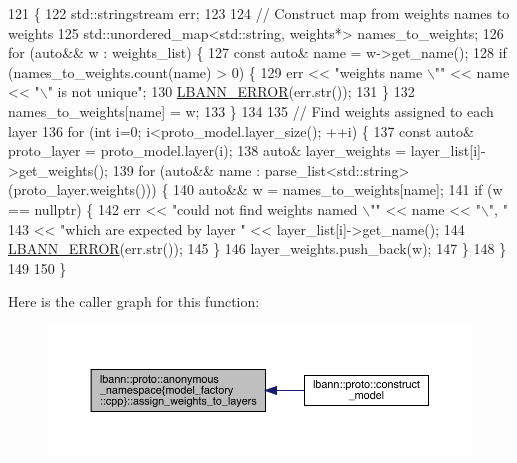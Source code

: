 \begin{DoxyCode}
121                                                                   \{
122   std::stringstream err;
123 
124   \textcolor{comment}{// Construct map from weights names to weights}
125   std::unordered\_map<std::string, weights*> names\_to\_weights;
126   \textcolor{keywordflow}{for} (\textcolor{keyword}{auto}&& w : weights\_list) \{
127     \textcolor{keyword}{const} \textcolor{keyword}{auto}& name = w->get\_name();
128     \textcolor{keywordflow}{if} (names\_to\_weights.count(name) > 0) \{
129       err << \textcolor{stringliteral}{"weights name \(\backslash\)""} << name << \textcolor{stringliteral}{"\(\backslash\)" is not unique"};
130       \hyperlink{base_8hpp_a80b1d707117e968a6951b7222e4b2b87}{LBANN\_ERROR}(err.str());
131     \}
132     names\_to\_weights[name] = w;
133   \}
134 
135   \textcolor{comment}{// Find weights assigned to each layer}
136   \textcolor{keywordflow}{for} (\textcolor{keywordtype}{int} i=0; i<proto\_model.layer\_size(); ++i) \{
137     \textcolor{keyword}{const} \textcolor{keyword}{auto}& proto\_layer = proto\_model.layer(i);
138     \textcolor{keyword}{auto}& layer\_weights = layer\_list[i]->get\_weights();
139     \textcolor{keywordflow}{for} (\textcolor{keyword}{auto}&& name : parse\_list<std::string>(proto\_layer.weights())) \{
140       \textcolor{keyword}{auto}&& w = names\_to\_weights[name];
141       \textcolor{keywordflow}{if} (w == \textcolor{keyword}{nullptr}) \{
142         err << \textcolor{stringliteral}{"could not find weights named \(\backslash\)""} << name << \textcolor{stringliteral}{"\(\backslash\)", "}
143             << \textcolor{stringliteral}{"which are expected by layer "} << layer\_list[i]->get\_name();
144         \hyperlink{base_8hpp_a80b1d707117e968a6951b7222e4b2b87}{LBANN\_ERROR}(err.str());
145       \}
146       layer\_weights.push\_back(w);
147     \}
148   \}  
149 
150 \}
\end{DoxyCode}
Here is the caller graph for this function\+:\nopagebreak
\begin{figure}[H]
\begin{center}
\leavevmode
\includegraphics[width=350pt]{namespacelbann_1_1proto_1_1anonymous__namespace_02model__factory_8cpp_03_a19d0eaf0259647155039ed45eb980b05_icgraph}
\end{center}
\end{figure}
